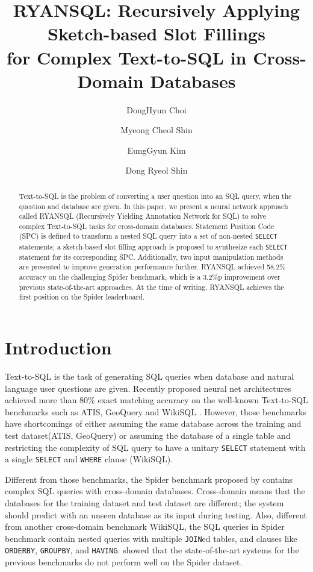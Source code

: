 \documentclass[11pt,a4paper]{article}
\title{RYANSQL: Recursively Applying Sketch-based Slot Fillings\\for Complex Text-to-SQL in Cross-Domain Databases}
\author[1,2]{ DongHyun Choi}
\author[1]{ Myeong Cheol Shin}
\author[1]{ EungGyun Kim}
\author[2]{ Dong Ryeol Shin}
\affil[1]{ Kakao Enterprise, Pangyo, South Korea}
\affil[ ]{\textit {\{heuristic.c,index.sh.jason.ng\}@kakaoenterprise.com}}
\affil[2]{Sungkyunkwan University, Suwon, South Korea}
\affil[ ]{\textit {drshin@skku.edu}}
\date{}
\begin{document}
\maketitle
\begin{abstract}
Text-to-SQL is the problem of converting  a user question into an SQL query, when the question and database are given. In this paper, we present a neural network approach called RYANSQL (Recursively Yielding Annotation Network for SQL) to solve complex Text-to-SQL tasks for cross-domain databases. Statement Position Code (SPC) is defined to transform a nested SQL query into a set of non-nested \texttt{SELECT} statements; a sketch-based slot filling approach is proposed to synthesize each \texttt{SELECT} statement for its corresponding SPC. Additionally, two input manipulation methods are presented to improve generation performance further. RYANSQL achieved 58.2\% accuracy on the challenging Spider benchmark, which is a 3.2\%p improvement over previous state-of-the-art approaches. At the time of writing, RYANSQL achieves the first position on the Spider leaderboard.
 
 \end{abstract}

\section{Introduction}
Text-to-SQL is the task of generating SQL queries when database and natural language user questions are given. Recently proposed neural net architectures achieved more than 80\% exact matching accuracy on the well-known Text-to-SQL benchmarks such as ATIS, GeoQuery and WikiSQL \citep{sqlnet, typesql, incsql, dong:18, sqlova, xsql}. However, those benchmarks have shortcomings of either assuming the same database across the training and test dataset(ATIS, GeoQuery) or assuming the database of a single table and restricting the complexity of SQL query to have a unitary \texttt{SELECT} statement with a single \texttt{SELECT} and \texttt{WHERE} clause (WikiSQL). 

Different from those benchmarks, the Spider benchmark proposed by \citet{Yu:18} contains complex SQL queries with cross-domain databases. Cross-domain means that the databases for the training dataset and test dataset are different; the system should predict with an unseen database as its input during testing. Also, different from another cross-domain benchmark WikiSQL, the SQL queries in Spider benchmark contain nested queries with multiple \texttt{JOIN}ed tables, and clauses like \texttt{ORDERBY}, \texttt{GROUPBY}, and \texttt{HAVING}. \citet{Yu:18} showed that the state-of-the-art systems for the previous benchmarks do not perform well on the Spider dataset.
\end{document}
